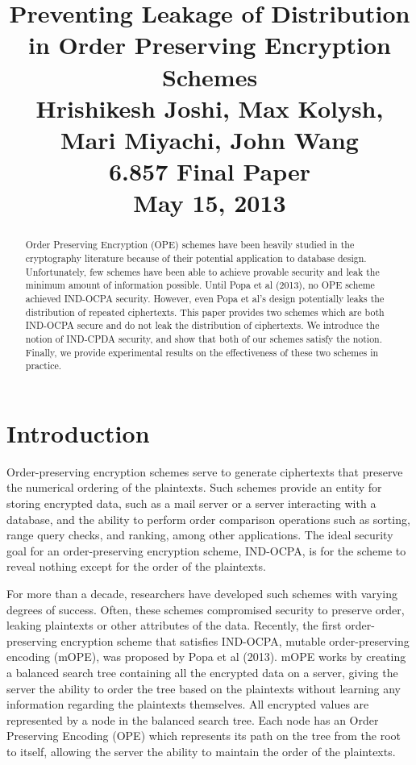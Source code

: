 \documentclass[12pt]{article}
\title{
  Preventing Leakage of Distribution in Order Preserving Encryption Schemes \\ \vspace*{.3in}
\small Hrishikesh Joshi, Max Kolysh, Mari Miyachi, John Wang \\
\small 6.857 Final Paper \\
\small May 15, 2013}
\date{}
\begin{document}
\maketitle

\begin{abstract}
  Order Preserving Encryption (OPE) schemes have been heavily studied in the cryptography literature because of their potential application to database design. Unfortunately, few schemes have been able to achieve provable security and leak the minimum amount of information possible. Until Popa et al (2013), no OPE scheme achieved IND-OCPA security. However, even Popa et al's design potentially leaks the distribution of repeated ciphertexts. This paper provides two schemes which are both IND-OCPA secure and do not leak the distribution of ciphertexts. We introduce the notion of IND-CPDA security, and show that both of our schemes satisfy the notion. Finally, we provide experimental results on the effectiveness of these two schemes in practice.
\end{abstract}

\newpage

\tableofcontents

\newpage

\section{Introduction}

Order-preserving encryption schemes serve to generate ciphertexts that preserve the numerical ordering of the plaintexts. Such schemes provide an entity for storing encrypted data, such as a mail server or a server interacting with a database, and the ability to perform order comparison operations such as sorting, range query checks, and ranking, among other applications. The ideal security goal for an order-preserving encryption scheme, IND-OCPA, is for the scheme to reveal nothing except for the order of the plaintexts.

For more than a decade, researchers have developed such schemes with varying degrees of success. Often, these schemes compromised security to preserve order, leaking plaintexts or other attributes of the data. Recently, the first order-preserving encryption scheme that satisfies IND-OCPA, mutable order-preserving encoding (mOPE), was proposed by Popa et al (2013). mOPE works by creating a balanced search tree containing all the encrypted data on a server, giving the server the ability to order the tree based on the plaintexts without learning any information regarding the plaintexts themselves. All encrypted values are represented by a node in the balanced search tree. Each node has an Order Preserving Encoding (OPE) which represents its path on the tree from the root to itself, allowing the server the ability to maintain the order of the plaintexts.
\end{document}
